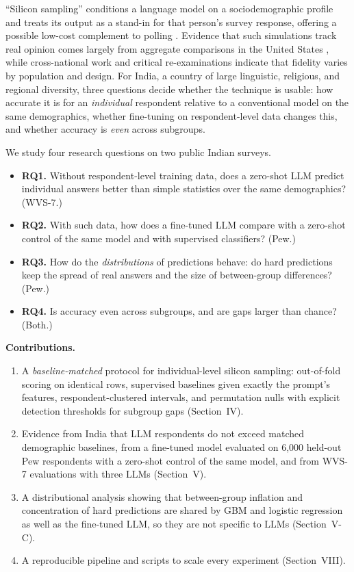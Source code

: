\documentclass[conference]{IEEEtran}
\begin{document}
``Silicon sampling'' conditions a language model on a sociodemographic profile and treats its output as a stand-in for that person's survey response, offering a possible low-cost complement to polling \cite{argyle2023}. Evidence that such simulations track real opinion comes largely from aggregate comparisons in the United States \cite{argyle2023,santurkar2023}, while cross-national work \cite{durmus2023} and critical re-examinations \cite{bisbee2024} indicate that fidelity varies by population and design. For India, a country of large linguistic, religious, and regional diversity, three questions decide whether the technique is usable: how accurate it is for an \emph{individual} respondent relative to a conventional model on the same demographics, whether fine-tuning on respondent-level data changes this, and whether accuracy is \emph{even} across subgroups.

We study four research questions on two public Indian surveys.
\begin{itemize}
    \item \textbf{RQ1.} Without respondent-level training data, does a zero-shot LLM predict individual answers better than simple statistics over the same demographics? (WVS-7.)
    \item \textbf{RQ2.} With such data, how does a fine-tuned LLM compare with a zero-shot control of the same model and with supervised classifiers? (Pew.)
    \item \textbf{RQ3.} How do the \emph{distributions} of predictions behave: do hard predictions keep the spread of real answers and the size of between-group differences? (Pew.)
    \item \textbf{RQ4.} Is accuracy even across subgroups, and are gaps larger than chance? (Both.)
\end{itemize}

\textbf{Contributions.}
\begin{enumerate}
    \item A \emph{baseline-matched} protocol for individual-level silicon sampling: out-of-fold scoring on identical rows, supervised baselines given exactly the prompt's features, respondent-clustered intervals, and permutation nulls with explicit detection thresholds for subgroup gaps (Section~IV).
    \item Evidence from India that LLM respondents do not exceed matched demographic baselines, from a fine-tuned model evaluated on 6{,}000 held-out Pew respondents with a zero-shot control of the same model, and from WVS-7 evaluations with three LLMs (Section~V).
    \item A distributional analysis showing that between-group inflation and concentration of hard predictions are shared by GBM and logistic regression as well as the fine-tuned LLM, so they are not specific to LLMs (Section~V-C).
    \item A reproducible pipeline and scripts to scale every experiment (Section~VIII).
\end{enumerate}
\end{document}
